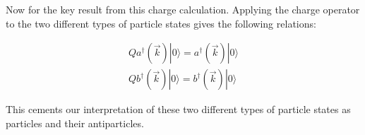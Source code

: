 \documentclass[a4]{article}
\begin{document}
    Now for the key result from this charge calculation. Applying the charge operator to the two different types of particle states gives the following relations:

    \begin{equation}
        \begin{aligned}
            Q a^{\dagger} (\vec{k}) | 0 \rangle = a^{\dagger} (\vec{k}) | 0 \rangle \\
            Q b^{\dagger} (\vec{k}) | 0 \rangle = b^{\dagger} (\vec{k}) | 0 \rangle
        \end{aligned}
    \end{equation}

    This cements our interpretation of these two different types of particle states as particles and their antiparticles.
\end{document}
